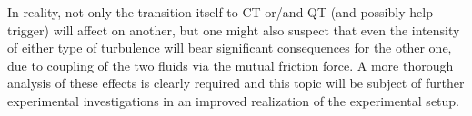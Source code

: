 In reality, not only the transition itself to CT or/and QT (and possibly help trigger) will affect on another, but one might also suspect that even the intensity of either type of turbulence will bear significant consequences for the other one, due to coupling of the two fluids via the mutual friction force. A more thorough analysis of these effects is clearly required and this topic will be subject of further experimental investigations in an improved realization of the experimental setup.
